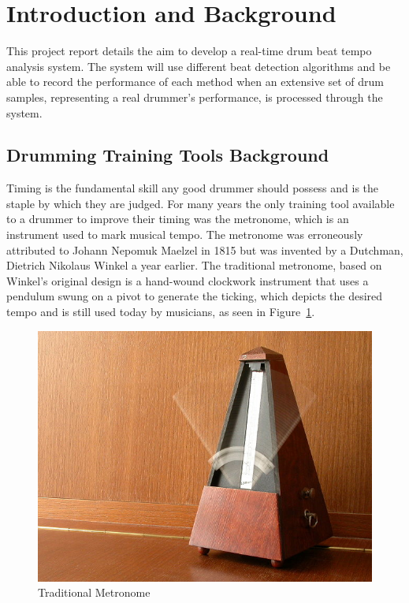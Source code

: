 \documentclass[a4paper, 11pt]{article}
\begin{document}
\maketitle{} \section{Introduction and Background}

This project report details the aim to develop a real-time drum beat tempo analysis system. The system will use different beat detection algorithms and be able to record the performance of each method when an extensive set of drum samples, representing a real drummer's performance, is processed through the system.

\subsection{Drumming Training Tools Background}
Timing is the fundamental skill any good drummer should possess and is the staple by which they are judged. For many years the only training tool available to a drummer to improve their timing was the metronome, which is an instrument used to mark musical tempo. The metronome was erroneously attributed to Johann Nepomuk Maelzel in 1815 but was invented by a Dutchman, Dietrich Nikolaus Winkel a year earlier. The traditional metronome, based on Winkel's original design is a hand-wound clockwork instrument that uses a pendulum swung on a pivot to generate the ticking, which depicts the desired tempo \cite{brit-metro} and is still used today by musicians, as seen in Figure~\ref{fig: TradMet}. \par

\begin{figure}[ht]
	\centering
	\includegraphics[scale=0.25]{TradMet}
	\caption{Traditional Metronome}%
	\label{fig: TradMet}
\end{figure}
\end{document}
